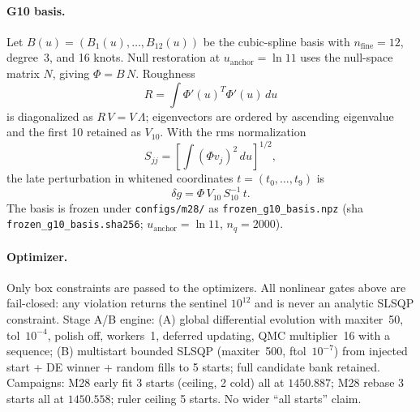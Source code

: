 \paragraph{G10 basis.}
Let $B(u) = (B_{1}(u),\dots,B_{12}(u))$ be the cubic-spline basis
\citep{deBoor1978} with $n_{\mathrm{fine}} = 12$, degree~3, and 16
knots. Null restoration at $u_{\mathrm{anchor}} = \ln 11$ uses the
null-space matrix $N$, giving $\Phi = B\,N$. Roughness
\begin{equation}
R = \int \Phi'(u)^{T} \Phi'(u)\,du
\end{equation}
is diagonalized as $R\,V = V\,\Lambda$; eigenvectors are ordered by
ascending eigenvalue and the first 10 retained as $V_{10}$. With the
rms normalization
\begin{equation}
S_{jj} = \left[\int (\Phi v_{j})^{2}\,du\right]^{1/2},
\end{equation}
the late perturbation in whitened coordinates $t = (t_{0},\dots,t_{9})$
is
\begin{equation}
\boxed{\delta g = \Phi\,V_{10}\,S_{10}^{-1}\,t}.
\end{equation}
The basis is frozen under \texttt{configs/m28/} as
\texttt{frozen\_g10\_basis.npz} (sha
\texttt{frozen\_g10\_basis.sha256};
$u_{\mathrm{anchor}} = \ln 11$, $n_{q} = 2000$).

\paragraph{Optimizer.}
Only box constraints are passed to the optimizers. All nonlinear gates
above are fail-closed: any violation returns the sentinel $10^{12}$ and
is never an analytic SLSQP constraint. Stage A/B engine: (A) global
differential evolution \citep{Storn1997} with maxiter~50,
tol~$10^{-4}$, polish off, workers~1, deferred updating,
QMC multiplier~16 with a \citep{Sobol1967} sequence; (B) multistart
bounded SLSQP \citep{Kraft1988} (maxiter~500, ftol~$10^{-7}$) from
injected start + DE winner + random fills to 5 starts; full candidate
bank retained. Campaigns: M28 early fit 3 starts (ceiling, 2 cold) all
at $1450.887$; M28 rebase 3 starts all at $1450.558$; ruler ceiling 5
starts. No wider ``all starts'' claim.

